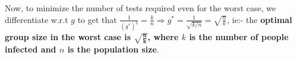 \documentclass[a4paper,11pt]{article}
\numberwithin{definition}{section}
\numberwithin{mytheorem}{subsection}
\begin{document}
Now, to minimize the number of tests required even for the worst case, we differentiate w.r.t $g$ to get that $\frac{1}{(g^*)^2} = \frac{k}{n}\Rightarrow g^* = \frac{1}{\sqrt{k/n}} = \sqrt{\frac{n}{k}}$, ie:- the \textbf{optimal group size in the worst case is $\boldsymbol{\sqrt{\frac{n}{k}}}$, where $k$ is the number of people infected and $n$ is the population size}.
\end{document}
